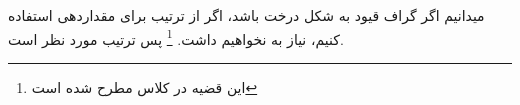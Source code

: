 \documentclass{university}
\begin{document}
\setupdocument

\section{}


\section{}
\subsection{}
میدانیم اگر گراف قیود به شکل درخت باشد، اگر از ترتیب 
برای مقداردهی استفاده کنیم، نیاز به 
نخواهیم داشت. 
\footnote{این قضیه در کلاس مطرح شده است}
پس ترتیب مورد نظر 
است. 
\end{document}
